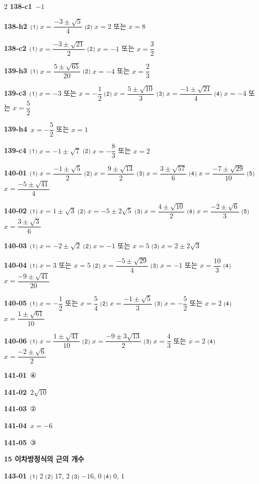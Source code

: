\documentclass[10pt,a4paper]{article}
\begin{document}
\begin{multicols}{2}
\noindent\textbf{138-c1}\ $-1$\par
\noindent\textbf{138-h2}\ ⑴ $x=\dfrac{-3\pm\sqrt{5}}{4}$ ⑵ $x=2$ 또는 $x=8$\par
\noindent\textbf{138-c2}\ ⑴ $x=\dfrac{-3\pm\sqrt{21}}{2}$ ⑵ $x=-1$ 또는 $x=\dfrac{3}{2}$\par
\noindent\textbf{139-h3}\ ⑴ $x=\dfrac{5\pm\sqrt{65}}{20}$ ⑵ $x=-4$ 또는 $x=\dfrac{2}{3}$\par
\noindent\textbf{139-c3}\ ⑴ $x=-3$ 또는 $x=-\dfrac{1}{2}$ ⑵ $x=\dfrac{5\pm\sqrt{10}}{3}$ ⑶ $x=\dfrac{-1\pm\sqrt{21}}{4}$ ⑷ $x=-4$ 또는 $x=\dfrac{5}{2}$\par
\noindent\textbf{139-h4}\ $x=-\dfrac{5}{2}$ 또는 $x=1$\par
\noindent\textbf{139-c4}\ ⑴ $x=-1\pm\sqrt{7}$ ⑵ $x=-\dfrac{8}{3}$ 또는 $x=2$\par
\noindent\textbf{140-01}\ ⑴ $x=\dfrac{-1\pm\sqrt{5}}{2}$ ⑵ $x=\dfrac{9\pm\sqrt{13}}{2}$ ⑶ $x=\dfrac{3\pm\sqrt{57}}{6}$ ⑷ $x=\dfrac{-7\pm\sqrt{29}}{10}$ ⑸ $x=\dfrac{-5\pm\sqrt{41}}{4}$\par
\noindent\textbf{140-02}\ ⑴ $x=1\pm\sqrt{3}$ ⑵ $x=-5\pm2\sqrt{5}$ ⑶ $x=\dfrac{4\pm\sqrt{10}}{2}$ ⑷ $x=\dfrac{-2\pm\sqrt{6}}{3}$ ⑸ $x=\dfrac{3\pm\sqrt{3}}{6}$\par
\noindent\textbf{140-03}\ ⑴ $x=-2\pm\sqrt{2}$ ⑵ $x=-1$ 또는 $x=5$ ⑶ $x=2\pm2\sqrt{3}$\par
\noindent\textbf{140-04}\ ⑴ $x=3$ 또는 $x=5$ ⑵ $x=\dfrac{-5\pm\sqrt{29}}{4}$ ⑶ $x=-1$ 또는 $x=\dfrac{10}{3}$ ⑷ $x=\dfrac{-9\pm\sqrt{41}}{20}$\par
\noindent\textbf{140-05}\ ⑴ $x=-\dfrac{1}{2}$ 또는 $x=\dfrac{5}{4}$ ⑵ $x=\dfrac{-1\pm\sqrt{5}}{3}$ ⑶ $x=-\dfrac{5}{2}$ 또는 $x=2$ ⑷ $x=\dfrac{1\pm\sqrt{61}}{10}$\par
\noindent\textbf{140-06}\ ⑴ $x=\dfrac{1\pm\sqrt{41}}{10}$ ⑵ $x=\dfrac{-9\pm3\sqrt{13}}{2}$ ⑶ $x=\dfrac{4}{3}$ 또는 $x=2$ ⑷ $x=\dfrac{-2\pm\sqrt{6}}{2}$\par
\noindent\textbf{141-01}\ ④\par
\noindent\textbf{141-02}\ $2\sqrt{10}$\par
\noindent\textbf{141-03}\ ②\par
\noindent\textbf{141-04}\ $x=-6$\par
\noindent\textbf{141-05}\ ③\par
\noindent\textbf{15 이차방정식의 근의 개수}\par\smallskip
\noindent\textbf{143-01}\ ⑴ $2$ ⑵ $17$, $2$ ⑶ $-16$, $0$ ⑷ $0$, $1$\par

\end{multicols}
\end{document}
